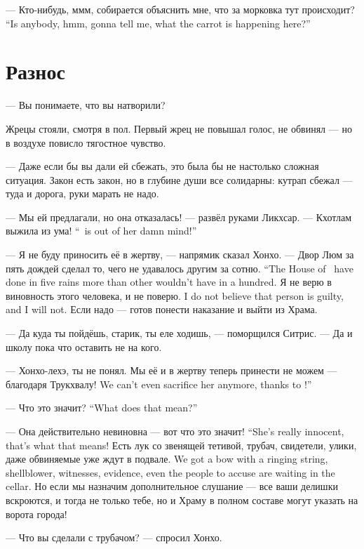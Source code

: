{--- Кто-нибудь, ммм, собирается объяснить мне, что за морковка тут происходит?}
{``Is anybody, hmm, gonna tell me, what the carrot is happening here?''}

\section{Разнос}

--- Вы понимаете, что вы натворили?

Жрецы стояли, смотря в пол.
Первый жрец не повышал голос, не обвинял --- но в воздухе повисло тягостное чувство.

--- Даже если бы вы дали ей сбежать, это была бы не настолько сложная ситуация.
Закон есть закон, но в глубине души все солидарны: кутрап сбежал --- туда и дорога, руки марать не надо.

--- Мы ей предлагали, но она отказалась! --- развёл руками Ликхсар.
{--- Кхотлам выжила из ума!}
{``\Kchotlam\ is out of her damn mind!''}

--- Я не буду приносить её в жертву, --- напрямик сказал Хонхо.
{--- Двор Люм за пять дождей сделал то, чего не удавалось другим за сотню.}
{``The House of \Loem\ have done in five rains more than other wouldn't have in a hundred.}
{Я не верю в виновность этого человека, и не поверю.}
{I do not believe that person is guilty, and I will not.}
Если надо --- готов понести наказание и выйти из Храма.

--- Да куда ты пойдёшь, старик, ты еле ходишь, --- поморщился Ситрис.
--- Да и школу пока что оставить не на кого.

--- Хонхо-лехэ, ты не понял.
{Мы её и в жертву теперь принести не можем --- благодаря Трукхвалу!}
{We can't even sacrifice her anymore, thanks to \Trukchual!''}

{--- Что это значит?}
{``What does that mean?''}

{--- Она действительно невиновна --- вот что это значит!}
{``She's really innocent, that's what that means!}
{Есть лук со звенящей тетивой, трубач, свидетели, улики, даже обвиняемые уже ждут в подвале.}
{We got a bow with a ringing string, shellblower, witnesses, evidence, even the people to accuse are waiting in the cellar.}
Но если мы назначим дополнительное слушание --- все ваши делишки вскроются, и тогда не только тебе, но и Храму в полном составе могут указать на ворота города!

--- Что вы сделали с трубачом? --- спросил Хонхо.

